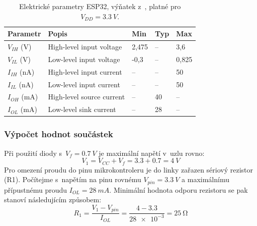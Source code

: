         \begin{table}[h]
            \centering
            \caption{Elektrické parametry ESP32, výňatek z~\cite{esp32-wroom-32e-datasheet}, platné pro \(V_{DD} =\qty{3,3}{V}\).}
            \label{tab:esp32-elektricke-parametry}
            \begin{tabular}{|l|l|l|l|l|}
            \hline
            \textbf{Parametr} & \textbf{Popis} & \textbf{Min} & \textbf{Typ} & \textbf{Max} \\ \hline\hline
            \(V_{IH}\) (V)   & High-level input voltage   & 2,475  & --  & 3,6          \\ \hline
            \(V_{IL}\) (V)   & Low-level input voltage    & -0,3 & --   & 0,825   \\ \hline
            \(I_{IH}\) (nA)  & High-level input current   & --   & --   & 50           \\ \hline
            \(I_{IL}\) (nA)  & Low-level input current    & --   & --   & 50           \\ \hline
            \(I_{OH}\) (mA)  & High-level source current  & --   & 40   & --           \\ \hline
            \(I_{OL}\) (mA)  & Low-level sink current     & --   & 28   & --           \\ \hline
            \end{tabular}
        \end{table}

        \subsubsection{Výpočet hodnot součástek}
            Při použití diody s~\(V_{f} =\qty{0.7}{V}\) je maximální napětí v~uzlu  rovno:
            \begin{equation}
                V_{1} =V_{CC} +V_{f} = \num{3,3}+\num{0,7}=\qty{4}{V}
            \end{equation}
            Pro omezení proudu do pinu mikrokontroleru je do linky zařazen sériový rezistor (R1). Počítejme s~napětím na pinu rovnému \(V_{pin} =\qty{3.3}{V}\) a maximálnímu přípustnému proudu \(I_{OL} =\qty{28}{mA}\). Minimální hodnota odporu rezistoru se pak stanoví následujícím způsobem:
            \begin{equation}
                R_{1} =\frac{V_{1}- V_{pin}}{I_{OL} }=\frac{\num{4}-\num{3.3}}{\num{28e-3}}=\qty{25}{\ohm}
            \end{equation}

